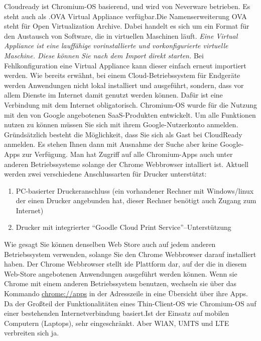\documentclass[a4paper,10pt]{article}
\begin{document}
\vspace{3mm}
Cloudready ist Chromium-OS basierend, und wird von Neverware betrieben. Es steht auch als .OVA Virtual Appliance verfügbar.Die Namenserweiterung OVA steht für Open Virtualization Archive. Dabei handelt es sich um ein Format für den Austausch von Software, die in virtuellen Maschinen läuft. \textit{Eine Virtual Appliance ist eine lauffähige vorinstallierte und vorkonfigurierte virtuelle Maschine. Diese können Sie nach dem Import direkt starten.} Bei Fehlkonfiguration eine Virtual Appliance kann dieser einfach erneut importiert werden.
\vspace{3mm}
Wie bereits erwähnt, bei einem Cloud-Betriebssystem für Endgeräte werden Anwendungen nicht lokal installiert und ausgeführt, sondern, dass vor allem Dienste im Internet damit genutzt werden können. Dafür ist eine Verbindung mit dem Internet obligatorisch. Chromium-OS wurde für die Nutzung mit den von Google angebotenen SaaS-Produkten entwickelt. Um alle Funktionen nutzen zu können müssen Sie sich mit ihrem Google-Nutzerkonto anmelden. Gründsätzlich besteht die Möglichkeit, dass Sie sich als Gast bei CloudReady anmelden. Es stehen Ihnen dann mit Ausnahme der Suche aber keine Google-Apps zur Verfügung. Man hat Zugriff auf alle Chromium-Apps auch unter anderen Betriebssysteme solange der Chrome Webbrowser intalliert ist. Aktuell werden zwei verschiedene Anschlussarten für Drucker unterstützt:
\begin{enumerate}
	\item PC-basierter Druckeranschluss (ein vorhandener Rechner mit Windows/linux der einen Drucker angebunden hat, dieser Rechner benötigt auch Zugang zum Internet)
	\item Drucker mit integrierter ``Goodle Cloud Print Service''--Unterstützung
\end{enumerate}

Wie gesagt Sie können denselben Web Store auch auf jedem anderen Betriebssystem verwenden, solange Sie den Chrome Webbrowser darauf installiert haben. Der Chrome Webbrowser stellt ide Plattform dar, auf der die in diesem Web-Store angebotenen Anwendungen ausgeführt werden können. Wenn sie Chrome mit einem anderen Betriebssystem benutzen, wechseln sie über das Kommando \url{chrome://apps} in der Adresszeile in eine Übersicht über ihre Apps.
Da der Großteil der Funktionalitäten eines Thin-Client-OS wie Chromium-OS auf einer bestehenden Internetverbindung basiert.Ist der Einsatz auf mobilen Computern (Laptops), sehr eingeschränkt. Aber WlAN, UMTS und LTE verbreiten sich ja.
\end{document}
